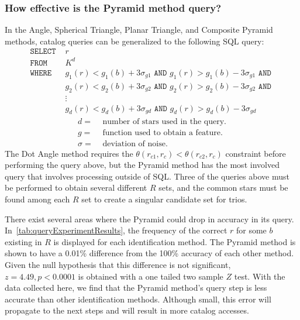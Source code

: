\subsubsection{How effective is the Pyramid method query?}
In the Angle, Spherical Triangle, Planar Triangle, and Composite Pyramid methods, catalog queries can be
generalized to the following SQL query:
\begin{align*}
    \texttt{SELECT } &r \\
    \texttt{FROM } &K^d \\
    \texttt{WHERE } &g_1(r) < g_1(b) + 3\sigma_{g1} \texttt{ AND } g_1(r) > g_1(b) - 3\sigma_{g1} \texttt{ AND } \\
    &g_2(r) < g_2(b) + 3\sigma_{g2} \texttt{ AND } g_2(r) > g_2(b) - 3\sigma_{g2} \texttt{ AND } \\
    &\vdots \\
    &g_d(r) < g_d(b) + 3\sigma_{gd} \texttt{ AND } g_d(r) > g_d(b) - 3\sigma_{gd}
\end{align*}
\begin{align*}
    d =& \text{ number of stars used in the query.} \\
    g =& \text{ function used to obtain a feature. } \\
    \sigma =& \text{ deviation of noise. }
\end{align*}
The Dot Angle method requires the $\theta(r_{c1}, r_{c}) < \theta(r_{c2}, r_c)$ constraint before performing the query
above, but the Pyramid method has the most involved query that involves processing outside of SQL\@.
Three of the queries above must be performed to obtain several different $R$ sets, and the common stars must be
found among each $R$ set to create a singular candidate set for trios.

There exist several areas where the Pyramid could drop in accuracy in its query.
In~\autoref{tab:queryExperimentResults}, the frequency of the correct $r$ for some $b$ existing in $R$ is displayed
for each identification method.
The Pyramid method is shown to have a 0.01\% difference from the 100\% accuracy of each other method.
Given the null hypothesis that this difference is not significant, $z= 4.49, p < 0.0001$ is obtained with a one tailed
two sample $Z$ test.
With the data collected here, we find that the Pyramid method's query step is less accurate than other identification
methods.
Although small, this error will propagate to the next steps and will result in more catalog accesses.

